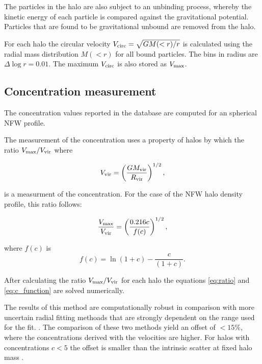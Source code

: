The particles in the halo are also subject to an unbinding process,
whereby the kinetic energy of each particle is compared against the
gravitational potential. Particles that are found to be gravitational
unbound are removed from the halo.

For each halo the circular velocity $V_{\rm circ}=\sqrt{GM(<r)/r}$ is
calculated using  the radial mass distribution $M(<r)$ for all bound
particles. The bins in radius are $\Delta \log r=0.01$. The maximum
$V_{\rm circ}$ is also stored as $V_{\rm max}$.

\subsection{Concentration measurement}


The concentration values reported in the database are computed for an
spherical NFW profile.  

The measurement of the concentration uses a property of halos by which
the ratio $V_{\rm max}/V_{\rm vir}$ where

\begin{equation}
V_{\rm vir} = \left(\frac{GM_{\rm vir}}{R_{\rm vir}}\right)^{1/2},
\end{equation}

is a measurment of the concentration. For the case of the NFW halo
density profile, this ratio follows:

\begin{equation}
\frac{V_{\rm max}}{V_{\rm vir}} = \left(\frac{0.216
  c}{f(c)}\right)^{1/2}, 
\label{eq:ratio}
\end{equation}

where $f(c)$ is
\begin{equation}
f(c) = \ln(1+c) - \frac{c}{(1+c)}.
\label{eq:c_function}
\end{equation}

After calculating the ratio $V_{\rm max}/V_{\rm vir}$ for each halo
the equations \ref{eq:ratio} and \ref{eq:c_function} are solved
numerically. 

The results of this method are computationally robust in comparison with
more uncertain radial fitting methoads that are strongly dependent on
the range used for the fit. \citep{Klypin:2010qw,Meneghetti2013}. The
comparison of these two methods yield an offset of $<15\%$, where the
concentrations derived with the velocities are
higher. For halos with concentrations $c<5$ the offset is smaller than
the intrinsic scatter at fixed halo mass \citep{Prada2012}.

